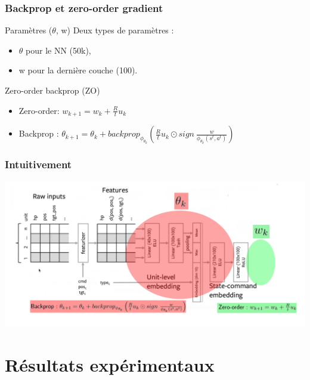\documentclass[smaller]{beamer}
\begin{document}
\begin{frame}
  \frametitle{Backprop et zero-order gradient}

  \begin{block}{Paramètres ($\theta$, w)}
    Deux types de paramètres :
    \begin{itemize}
    \item $\theta$ pour le NN (50k),
    \item w pour la dernière couche (100).
    \end{itemize}
  \end{block}
  
  \bigskip

  \begin{exampleblock}{Zero-order backprop (ZO)}
    \begin{itemize}
    \item Zero-order: $w_{k+1} = w_k + \frac{R}{t}u_k$
    \item    Backprop   :    $\theta_{k+1}   =    \theta_k   +  backprop_{\phi_{\theta_k}}\left(\frac{R}{t}u_k \odot sign\ \frac{w}{\phi_{\theta_k}(s^t,a^t)}\right)$
    \end{itemize}
  \end{exampleblock}

\end{frame}


\begin{frame}
  \frametitle{Intuitivement}

  \centerline{\includegraphics[width=\linewidth]{./figs/mise_a_jour}}  

\end{frame}


\section{Résultats expérimentaux}
\end{document}
